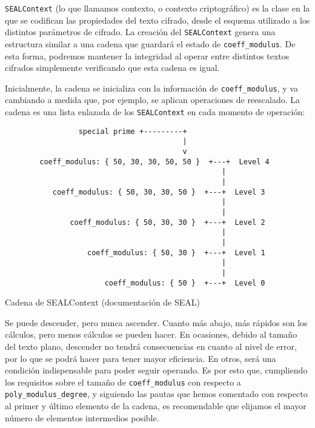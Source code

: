 \verb|SEALContext| (lo que llamamos contexto, o contexto criptográfico) es la clase en la que se codifican las propiedades del texto cifrado, desde el esquema utilizado a los distintos parámetros de cifrado. La creación del \verb|SEALContext| genera una estructura similar a una cadena que guardará el estado de \verb|coeff_modulus|. De esta forma, podremos mantener la integridad al operar entre distintos textos cifrados simplemente verificando que esta cadena es igual.

Inicialmente, la cadena se inicializa con la información de \verb|coeff_modulus|, y va cambiando a medida que, por ejemplo, se aplican operaciones de reescalado. La cadena es una lista enlazada de los \verb|SEALContext| en cada momento de operación:

\begin{listing}[ht]
    \begin{verbatim}
                 special prime +---------+
                                         |
                                         v
        coeff_modulus: { 50, 30, 30, 50, 50 }  +---+  Level 4
                                                  |
                                                  |
           coeff_modulus: { 50, 30, 30, 50 }  +---+  Level 3
                                                  |
                                                  |
               coeff_modulus: { 50, 30, 30 }  +---+  Level 2
                                                  |
                                                  |
                   coeff_modulus: { 50, 30 }  +---+  Level 1
                                                  |
                                                  |
                       coeff_modulus: { 50 }  +---+  Level 0
    \end{verbatim}
    \caption{Cadena de SEALContext (documentación de SEAL)}
    \label{fig:seal_levels}
\end{listing}

Se puede descender, pero nunca ascender. Cuanto más abajo, más rápidos son los cálculos, pero menos cálculos se pueden hacer. En ocasiones, debido al tamaño del texto plano, descender no tendrá consecuencias en cuanto al nivel de error, por lo que se podrá hacer para tener mayor eficiencia. En otros, será una condición indispensable para poder seguir operando. Es por esto que, cumpliendo los requisitos sobre el tamaño de \verb|coeff_modulus| con respecto a \verb|poly_modulus_degree|, y siguiendo las pautas que hemos comentado con respecto al primer y último elemento de la cadena, es recomendable que elijamos el mayor número de elementos intermedios posible.


